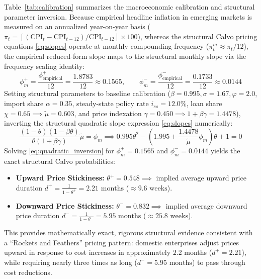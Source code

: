 \documentclass[review,12pt]{elsarticle}
\begin{document}
Table~\ref{tab:calibration} summarizes the macroeconomic calibration and structural parameter inversion. Because empirical headline inflation in emerging markets is measured on an annualized year-on-year basis ($\pi_t = [(\text{CPI}_t - \text{CPI}_{t-12})/\text{CPI}_{t-12}] \times 100$), whereas the structural Calvo pricing equations \eqref{eq:slopes} operate at monthly compounding frequency ($\pi_t^m \approx \pi_t / 12$), the empirical reduced-form slope maps to the structural monthly slope via the frequency scaling identity:
\begin{equation}
\phi_m^{+} = \frac{\phi_{\text{empirical}}^{+}}{12} = \frac{1.8783}{12} \approx 0.1565, \qquad
\phi_m^{-} = \frac{\phi_{\text{empirical}}^{-}}{12} = \frac{0.1733}{12} \approx 0.0144
\label{eq:scaling_identity}
\end{equation}
Setting structural parameters to baseline calibration ($\beta = 0.995, \sigma = 1.67, \varphi = 2.0$, import share $\alpha = 0.35$, steady-state policy rate $i_{ss} = 12.0\%$, loan share $\chi = 0.65 \implies \tilde{\mu} = 0.603$, and price indexation $\gamma = 0.450 \implies 1+\beta\gamma = 1.4478$), inverting the structural quadratic slope expression \eqref{eq:slopes} numerically:
\begin{equation}
\frac{(1-\theta)(1-\beta\theta)}{\theta(1+\beta\gamma)}\tilde{\mu} = \phi_m \implies 0.995\theta^2 - \left(1.995 + \frac{1.4478}{\tilde{\mu}}\phi_m\right)\theta + 1 = 0
\label{eq:quadratic_inversion}
\end{equation}
Solving \eqref{eq:quadratic_inversion} for $\phi_m^{+} = 0.1565$ and $\phi_m^{-} = 0.0144$ yields the exact structural Calvo probabilities:
\begin{itemize}
    \item \textbf{Upward Price Stickiness:} $\theta^{+} = 0.548 \implies$ implied average upward price duration $d^{+} = \frac{1}{1-\theta^{+}} = 2.21\text{ months}$ ($\approx 9.6\text{ weeks}$).
    \item \textbf{Downward Price Stickiness:} $\theta^{-} = 0.832 \implies$ implied average downward price duration $d^{-} = \frac{1}{1-\theta^{-}} = 5.95\text{ months}$ ($\approx 25.8\text{ weeks}$).
\end{itemize}
This provides mathematically exact, rigorous structural evidence consistent with a ``Rockets and Feathers'' pricing pattern: domestic enterprises adjust prices upward in response to cost increases in approximately $2.2$ months ($d^+ = 2.21$), while requiring nearly three times as long ($d^- = 5.95\text{ months}$) to pass through cost reductions.
\end{document}
